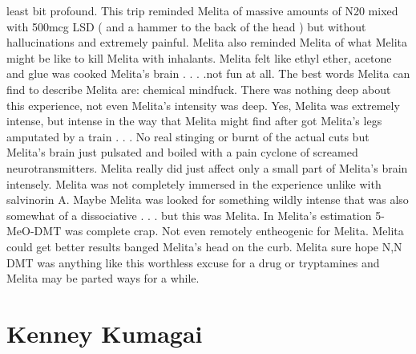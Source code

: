 \documentclass[12pt]{book}
\begin{document}
least bit profound. This trip reminded Melita of massive amounts of N20 mixed with 500mcg LSD ( and a hammer to the back of the head ) but without hallucinations and extremely painful. Melita also reminded Melita of what Melita might be like to kill Melita with inhalants. Melita felt like ethyl ether, acetone and glue was cooked Melita's brain . . .  .not fun at all. The best words Melita can find to describe Melita are: chemical mindfuck. There was nothing deep about this experience, not even Melita's intensity was deep. Yes, Melita was extremely intense, but intense in the way that Melita might find after got Melita's legs amputated by a train . . .  No real stinging or burnt of the actual cuts but Melita's brain just pulsated and boiled with a pain cyclone of screamed neurotransmitters. Melita really did just affect only a small part of Melita's brain intensely. Melita was not completely immersed in the experience unlike with salvinorin A. Maybe Melita was looked for something wildly intense that was also somewhat of a dissociative . . .  but this was Melita. In Melita's estimation 5-MeO-DMT was complete crap. Not even remotely entheogenic for Melita. Melita could get better results banged Melita's head on the curb. Melita sure hope N,N DMT was anything like this worthless excuse for a drug or tryptamines and Melita may be parted ways for a while.



\chapter{Kenney Kumagai}
\end{document}

